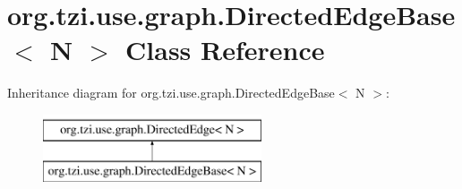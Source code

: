 \hypertarget{classorg_1_1tzi_1_1use_1_1graph_1_1_directed_edge_base_3_01_n_01_4}{\section{org.\-tzi.\-use.\-graph.\-Directed\-Edge\-Base$<$ N $>$ Class Reference}
\label{classorg_1_1tzi_1_1use_1_1graph_1_1_directed_edge_base_3_01_n_01_4}
}
Inheritance diagram for org.\-tzi.\-use.\-graph.\-Directed\-Edge\-Base$<$ N $>$\-:\begin{figure}[H]
\begin{center}
\leavevmode
\includegraphics[height=2.000000cm]{classorg_1_1tzi_1_1use_1_1graph_1_1_directed_edge_base_3_01_n_01_4}
\end{center}
\end{figure}
